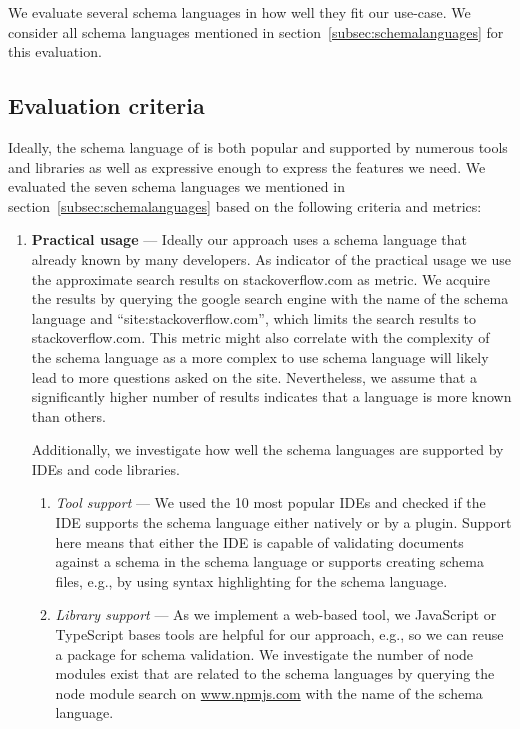 We evaluate several schema languages in how well they fit our use-case.
We consider all schema languages mentioned in section~\ref{subsec:schemalanguages} for this evaluation.

\subsection{Evaluation criteria}\label{subsec:evaluation-criteria} %

Ideally, the schema language of \toolname is both popular and supported by numerous tools and libraries as well as expressive enough to express the features we need.
We evaluated the seven schema languages we mentioned in section~\ref{subsec:schemalanguages} based on the following criteria and metrics:
\begin{enumerate}
    \item \textbf{Practical usage} --- Ideally our approach uses a schema language that already known by many developers.
    As indicator of the practical usage we use the approximate search results on stackoverflow.com as metric.
    We acquire the results by querying the google search engine with the name of the schema language and ``site:stackoverflow.com'', which limits the search results to stackoverflow.com.
    This metric might also correlate with the complexity of the schema language as a more complex to use schema language will likely lead to more questions asked on the site.
    Nevertheless, we assume that a significantly higher number of results indicates that a language is more known than others.

    Additionally, we investigate how well the schema languages are supported by IDEs and code libraries.
    \begin{enumerate}
        \item \textit{Tool support} --- We used the 10 most popular IDEs\cite{mostpopularides} and checked if the IDE supports the schema language either natively or by a plugin.
        Support here means that either the IDE is capable of validating documents against a schema in the schema language or supports creating schema files, e.g., by using syntax highlighting for the schema language.
        \item \textit{Library support} --- As we implement a web-based tool, we JavaScript or TypeScript bases tools are helpful for our approach, e.g., so we can reuse a package for schema validation.
        We investigate the number of node modules exist that are related to the schema languages by querying the node module search on \url{www.npmjs.com} with the name of the schema language.


\end{enumerate}
\end{enumerate}
